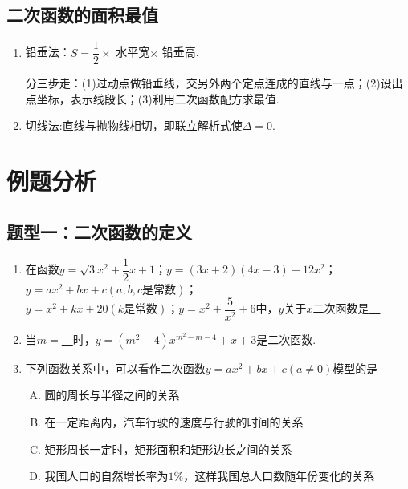 \documentclass[10pt]{ctexart}
\begin{document}
\subsection{二次函数的面积最值}
\begin{enumerate}
\item 铅垂法：$S=\dfrac{1}{2}\times$ 水平宽$\times$ 铅垂高.

分三步走：(1)过动点做铅垂线，交另外两个定点连成的直线与一点；(2)设出点坐标，表示线段长；(3)利用二次函数配方求最值.
\item 切线法:直线与抛物线相切，即联立解析式使$\Delta=0$.
\end{enumerate}
\section{例题分析}
\subsection{题型一：二次函数的定义}
\begin{dkyi}{}{}
   \begin{enumerate}[(1)]
   \item 在函数$y=\sqrt{3}x^2+\dfrac{1}{2}x+1$；$y=(3x+2)(4x-3)-12x^2$；$y=ax^2+bx+c(a,b,c\text{是常数})$；\\ $y=x^2+kx+20(k\text{是常数})$；$y=x^2+\dfrac{5}{x^2}+6$中，$y$关于$x$二次函数是\underline{~\hspace{2cm}~}
   \item 当$m=$\underline{~\hspace{2cm}~}时，$y=(m^2-4)x^{m^2-m-4}+x+3$是二次函数.
   \item 下列函数关系中，可以看作二次函数$y=ax^2+bx+c(a\neq 0)$模型的是\underline{~\hspace{2cm}~}
   \begin{enumerate}[A.]
   \item 圆的周长与半径之间的关系
   \item 在一定距离内，汽车行驶的速度与行驶的时间的关系
   \item 矩形周长一定时，矩形面积和矩形边长之间的关系
   \item 我国人口的自然增长率为$1\%$，这样我国总人口数随年份变化的关系
   \end{enumerate}
   \end{enumerate}
\end{dkyi}
\end{document}
